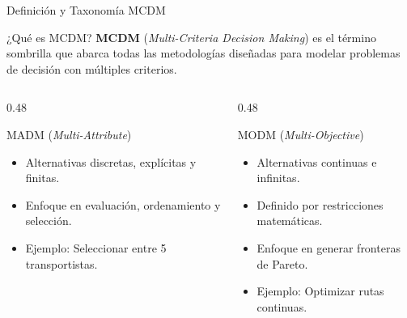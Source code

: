 \documentclass[aspectratio=169, 10pt]{beamer}
\begin{document}
\begin{frame}{Definición y Taxonomía MCDM}
    \begin{block}{¿Qué es MCDM?}
        \small\textbf{MCDM} (\emph{Multi-Criteria Decision Making}) es el término sombrilla que abarca todas las metodologías diseñadas para modelar problemas de decisión con múltiples criterios.
    \end{block}
    \begin{columns}[T]
        \begin{column}{0.48\textwidth}
            \begin{exampleblock}{MADM (\emph{Multi-Attribute})}
                \scriptsize
                \begin{itemize}
                    \item Alternativas discretas, explícitas y finitas.
                    \item Enfoque en evaluación, ordenamiento y selección.
                    \item Ejemplo: Seleccionar entre 5 transportistas.
                \end{itemize}
            \end{exampleblock}
        \end{column}
        
        \begin{column}{0.48\textwidth}
            \begin{block}{MODM (\emph{Multi-Objective})}
                \scriptsize
                \begin{itemize}
                    \item Alternativas continuas e infinitas.
                    \item Definido por restricciones matemáticas.
                    \item Enfoque en generar fronteras de Pareto.
                    \item Ejemplo: Optimizar rutas continuas.
                \end{itemize}
            \end{block}
        \end{column}
    \end{columns}
\end{frame}
\end{document}
